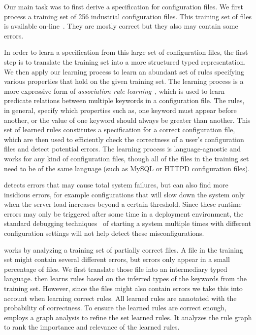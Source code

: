 Our main task was to first derive a specification for configuration 
files. We first process a training set of 256 industrial configuration files. This training set of files is
available on-line~\cite{configdataset}. They are mostly correct
but they also may contain some errors.

In order to learn a specification from this large set of configuration
files,
the first step is to 
translate the training set into a more structured typed representation.
We then apply our learning process to learn an abundant set of rules 
specifying various properties that hold on the given training set. 
The learning process is a more expressive form of \textit{association rule learning}~\cite{agrawal1993mining}, which is used to learn predicate relations between multiple keywords in a configuration file.
The rules, in general, specify which properties such as, one keyword must appear before another, or the value of one keyword should always be greater than another.
This set of learned rules constitutes a specification for a correct configuration file,
which are then used to efficiently check the correctness of a user's configuration files and detect 
potential errors. 
The learning process is language-agnostic and works for any kind 
of configuration files, though all of the files in the training set need to be of 
the same language (such as MySQL or HTTPD configuration files).



\app detects errors that may cause total system failures, but can also find more insidious errors, for example configurations that will slow down the system only when the server load increases beyond a certain threshold.
Since these runtime errors may only be triggered after some time in a deployment environment, the standard debugging techniques~\cite{Zeller:2005:WPF:1077048} of starting a system multiple times with different configuration settings will not help detect these misconfigurations.



\app works by analyzing a training set of partially correct files.
A file in the training set might contain several different errors, but errors only appear 
in a small percentage of files. 
We first translate those file into an intermediary typed language.
\app then learns rules based on the inferred types of the keywords from the training set.
However, since the files might also contain errors we take 
this into account when learning correct rules. All learned rules are 
annotated with the probability of correctness.  
To ensure the learned rules are correct enough,
\app employs a graph analysis to refine the set learned rules.
It analyzes the rule graph to rank the importance and relevance of the learned rules. 

